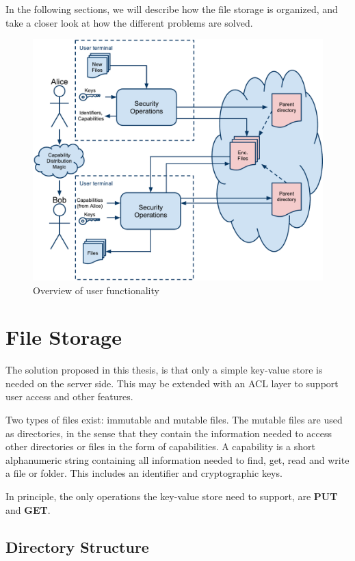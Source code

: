 \documentclass[pdftex,english,10pt,b5paper,twoside]{book}
\begin{document}
In the following sections, we will describe how the file storage is organized,
and take a closer look at how the different problems are solved.

\begin{figure}[h!]
    \centering
    \includegraphics[width=\columnwidth]{ArchitectureOverview.pdf}
    \caption{Overview of user functionality}
    \label{fig:AS:overview}
\end{figure}

\section{File Storage}
\label{sec:AS:FS}

The solution proposed in this thesis, is that only a simple key-value store is
needed on the server side. This may be extended with an \ac{ACL} layer to
support user access and other features.

Two types of files exist: immutable and mutable files. The mutable files are used
as directories, in the sense that they contain the information needed to access
other directories or files in the form of capabilities.
A capability is a short alphanumeric string containing all information needed
to find, get, read and write a file or folder. This includes an identifier and
cryptographic keys.

In principle, the only operations the key-value store need to support, are
\textbf{PUT} and \textbf{GET}.

\subsection{Directory Structure}
\end{document}
